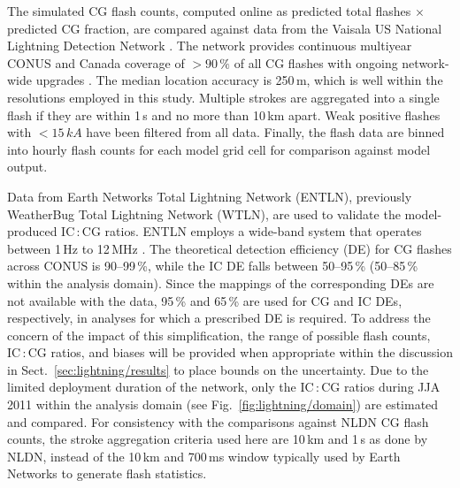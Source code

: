The simulated CG flash counts, computed online as predicted total flashes
$\times$ predicted CG fraction, are compared against data from the Vaisala
US National Lightning Detection Network \citep[NLDN;][]{Cummins:2009aa}. The
network provides continuous multiyear CONUS and Canada coverage of
$>90\,{\%}$ of all CG flashes with ongoing network-wide upgrades
\citep{Orville:2002uq,Orville:2010uq}. The median location accuracy is
250\,\unit{m}, which is well within the resolutions employed in this study.
Multiple strokes are aggregated into a single flash if they are within 1\,\unit{s}
and no more than 10\,\unit{km} apart. Weak positive flashes with
$<15\,\unit{kA}$ have been filtered from all data. Finally, the flash data
are binned into hourly flash counts for each model grid cell for comparison
against model output.

Data from Earth Networks Total Lightning Network (ENTLN), previously
WeatherBug Total Lightning Network (WTLN), are used to validate the
model-produced IC\,:\,CG ratios. ENTLN employs a wide-band system that
operates between 1\,\unit{Hz} to 12\,\unit{MHz} \citep{Liu:2011vn}. The
theoretical detection efficiency (DE) for CG flashes across CONUS is
90--99\,{\%}, while the IC DE falls between 50--95\,{\%} (50--85\,{\%} within
the analysis domain). Since the mappings of the corresponding DEs are not
available with the data, 95\,{\%} and 65\,{\%} are used for CG and IC DEs,
respectively, in analyses for which a prescribed DE is required. To address
the concern of the impact of this simplification, the range of possible flash
counts, IC\,:\,CG ratios, and biases will be provided when appropriate within
the discussion in Sect.~\ref{sec:lightning/results} to place bounds on the
uncertainty. Due to the limited deployment duration of the network, only the
IC\,:\,CG ratios during JJA 2011 within the analysis domain (see
Fig.~\ref{fig:lightning/domain}) are estimated and compared. For consistency with the
comparisons against NLDN CG flash counts, the stroke aggregation criteria
used here are 10\,\unit{km} and 1\,s as done by NLDN, instead of the
10\,\unit{km} and 700\,\unit{ms} window typically used by Earth Networks to
generate flash statistics.



